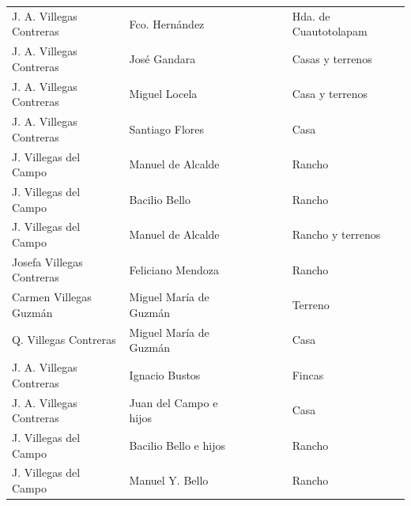 \documentclass[14pt,twoside,final]{extbook} %
\begin{document}
{\begin{longtable}[c]{@{}p{2.5cm}lrSrrl@{}}
J. A. Villegas Contreras & Fco. Hernández &  &  &  &  & Hda. de Cuautotolapam \\
J. A. Villegas Contreras & José Gandara &  &  &  &  & Casas y terrenos \\
J. A. Villegas Contreras & Miguel Locela &  &  &  &  & Casa y terrenos \\
J. A. Villegas Contreras & Santiago Flores &  &  &  &  & Casa \\
J. Villegas del Campo & Manuel de Alcalde &  & &  &  & Rancho \\
J. Villegas del Campo & Bacilio Bello &  &  & {} & {} & Rancho \\
J. Villegas del Campo & Manuel de Alcalde &  &  &  &  & Rancho y terrenos \\
Josefa Villegas Contreras & Feliciano Mendoza &  &  & {} & {} & Rancho \\
Carmen Villegas Guzmán & Miguel María de Guzmán &  & {} & {} & {} & Terreno \\
Q. Villegas Contreras & Miguel María de Guzmán &  &  & {} & {} & Casa \\
J. A. Villegas Contreras & Ignacio Bustos &  &  &  &  & Fincas \\
J. A. Villegas Contreras & Juan del Campo e hijos &  &  &  &  & Casa \\
J. Villegas del Campo & Bacilio Bello e hijos &  &  & {} & {} & Rancho \\
J. Villegas del Campo & Manuel Y. Bello &  & {} & {} & {} & Rancho \\

\end{longtable}}
\end{document}
